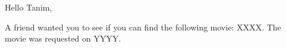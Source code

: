 \documentclass[12pt, fleqn]{article}
\begin{document}
Hello Tanim,

A friend wanted you to see if you can find the following movie:
XXXX. The movie was requested on YYYY.
\end{document}
